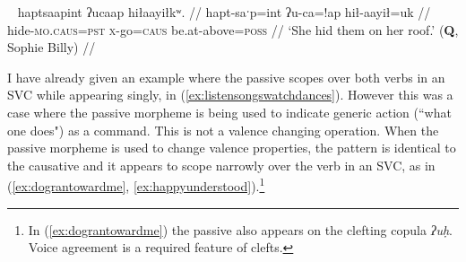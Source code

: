 
\ex~ \label{ex:hideonroof}
\begingl
\glpreamble haptsaapint ʔucaap hiłaayiłkʷ. //
\gla hapt-saˑp=int ʔu-ca=!ap hił-aayił=uk //
\glb hide-\textsc{mo.caus}=\textsc{pst} \textsc{x}-go=\textsc{caus} be.at-above=\textsc{poss} //
\glft `She hid them on her roof.' (\textbf{Q}, Sophie Billy) //
\endgl
\xe


\begin{comment}


\ex \label{ex:headonback}
\begingl
\glpreamble ʔuc̓aʔap̓at t̓uḥc̓iti hił ʔapw̓inʔatʔi. //
\gla ʔucaap=!at t̓uḥc̓iti hił ʔapw̓in=!at=ʔiˑ //
\glb make.go=\textsc{pass} head be.at shoulder=\textsc{poss.inalien}=\textsc{art} //
\glft `He put his head on his shoulder.' (\textbf{C}, \textit{tupaat} Julia Lucas) //
\endgl
\xe

\ex~ \label{ex:makesitdown}
\begingl
\glpreamble ʔaḥʔaaʔaƛʔał t̓iqʷaasʔap̓aƛʔał ḥaakʷaaƛʔi Monica. //
\gla ʔaḥʔaaʔaƛ=ʔał t̓iqʷ-aas=!ap=!aƛ=ʔał ḥaakʷaaƛ=ʔiˑ Monica //
\glb and.then=\textsc{pl} be.at=\textsc{caus} sit-horizontal.surface=\textsc{caus}=\textsc{now}=\textsc{pl} young.woman=\textsc{art} Monica //
\glft `And then they made the young girl Monica sit on a chair.' (\textbf{C}, \textit{tupaat} Julia Lucas) //
\endgl
\xe
\end{comment}

I have already given an example where the passive scopes over both verbs in an SVC while appearing singly, in (\ref{ex:listensongswatchdances}). However this was a case where the passive morpheme is being used to indicate generic action (``what one does") as a command. This is not a valence changing operation. When the passive morpheme is used to change valence properties, the pattern is identical to the causative and it appears to scope narrowly over the verb in an SVC, as in (\ref{ex:dograntowardme}, \ref{ex:happyunderstood}).\footnote{In (\ref{ex:dograntowardme}) the passive also appears on the clefting copula \textit{ʔuḥ}. Voice agreement is a required feature of clefts.}

